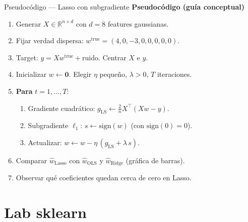 \begin{frame}{Pseudocódigo — Lasso con subgradiente}
\footnotesize
\textbf{Pseudocódigo (guía conceptual)}
\begin{enumerate}\footnotesize
  \item Generar $X\in\mathbb{R}^{n\times d}$ con $d=8$ features gaussianas.
  \item Fijar verdad dispersa: $w^{\mathrm{true}} = (4, 0, -3, 0, 0, 0, 0, 0)$.
  \item Target: $y = Xw^{\mathrm{true}} + \text{ruido}$. Centrar $X$ e $y$.
  \item Inicializar $w\leftarrow \mathbf{0}$. Elegir $\eta$ pequeño, $\lambda > 0$, $T$ iteraciones.
  \item \textbf{Para} $t = 1,\dots,T$:
  \begin{enumerate}\scriptsize
    \item Gradiente cuadrático: $g_{\mathrm{LS}} \leftarrow \frac{2}{n}X^\top(Xw - y)$.
    \item Subgradiente $\ell_1$: $s \leftarrow \mathrm{sign}(w)$ \;(con $\mathrm{sign}(0)=0$).
    \item Actualizar: $w \leftarrow w - \eta\,(g_{\mathrm{LS}} + \lambda\, s)$.
  \end{enumerate}
  \item Comparar $\hat w_{\mathrm{Lasso}}$ con $\hat w_{\mathrm{OLS}}$ y $\hat w_{\mathrm{Ridge}}$ (gráfica de barras).
  \item Observar qué coeficientes quedan cerca de cero en Lasso.
\end{enumerate}
\end{frame}

\section[Lab sklearn]{Lab sklearn\label{sec:lab-sklearn-w09}}

